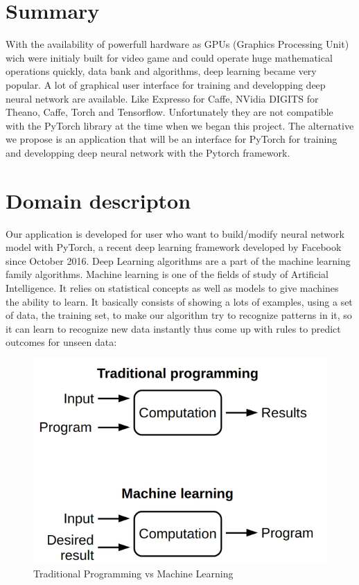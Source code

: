  \section{Summary}
 With the availability of powerfull hardware as GPUs (Graphics Processing Unit) wich were initialy built for video game and could operate huge mathematical operations quickly, data bank and algorithms, deep learning became very popular.  A lot of graphical user interface for training and developping deep neural network are available. Like Expresso for Caffe, NVidia DIGITS for Theano, Caffe, Torch and Tensorflow. Unfortunately they are not compatible with the PyTorch library at the time when we began this project. The alternative we propose is an application that will be an interface for PyTorch for training and developping deep neural network with the Pytorch framework.

\section{Domain descripton}
Our application is developed for user who want to build/modify neural network model with PyTorch, a recent deep learning framework developed by Facebook since October 2016. Deep Learning algorithms are a part of the machine learning family algorithms. Machine learning is one of the fields of study of Artificial Intelligence. It relies on statistical concepts as well as models to give machines the ability to learn. It basically consists of showing a lots of examples, using a set of data, the training set, to make our algorithm try to recognize patterns in it, so it can learn to recognize new data instantly thus come up with rules to predict outcomes for unseen data:

\begin{figure}[!ht]
    \center
    \includegraphics[scale=0.3]{figures/marchine_learning_para.png}
    \caption{Traditional Programming vs Machine Learning}
\end{figure}


